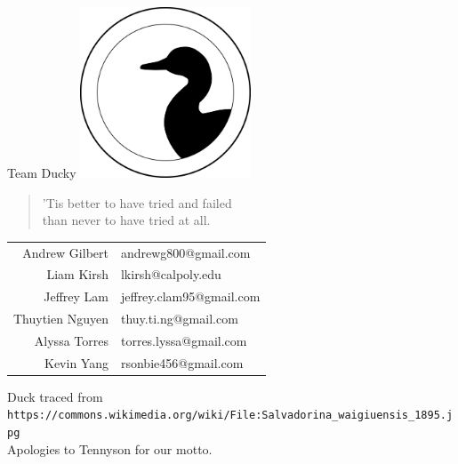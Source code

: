 \documentclass[titlepage,12 pt]{article}
\begin{document}
\begin{titlepage}
  \centering
  {\Huge Team Ducky}
  \vfill
  \includegraphics[width=2in]{duck}
  \vfill
  {    \large
    \begin{minipage}{\widthof{'Tis better to have tried and failed} + 1in}
      \begin{verse}
        'Tis better to have tried and failed\\
        than never to have tried at all.
      \end{verse}
    \end{minipage}
  }
  \vfill
  \begin{tabular}{rl}
    Andrew Gilbert & andrewg800@gmail.com\\
    Liam Kirsh & lkirsh@calpoly.edu\\
    Jeffrey Lam & jeffrey.clam95@gmail.com\\
    Thuytien Nguyen & thuy.ti.ng@gmail.com\\
    Alyssa Torres & torres.lyssa@gmail.com\\
    Kevin Yang & rsonbie456@gmail.com
  \end{tabular}
  \vfill
  {\footnotesize Duck traced from \verb|https://commons.wikimedia.org/wiki/File:Salvadorina_waigiuensis_1895.jpg|\\Apologies to Tennyson for our motto.}
\end{titlepage}
% 
% 
% 
\end{document}
